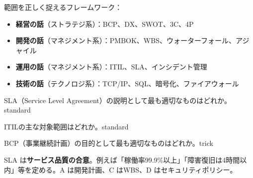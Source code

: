 \begin{keypoint}
範囲を正しく捉えるフレームワーク：
\begin{itemize}
  \item \textbf{経営の話}（ストラテジ系）：BCP、DX、SWOT、3C、4P
  \item \textbf{開発の話}（マネジメント系）：PMBOK、WBS、ウォーターフォール、アジャイル
  \item \textbf{運用の話}（マネジメント系）：ITIL、SLA、インシデント管理
  \item \textbf{技術の話}（テクノロジ系）：TCP/IP、SQL、暗号化、ファイアウォール
\end{itemize}
\end{keypoint}


\begin{mondai}{SLA（Service Level Agreement）の説明として最も適切なものはどれか。}{standard}
\end{mondai}

\begin{mondai}{ITILの主な対象範囲はどれか。}{standard}
\end{mondai}

\begin{mondai}{BCP（事業継続計画）の目的として最も適切なものはどれか。}{trick}
\end{mondai}

\kaitoupage


\begin{kaisetsu}
SLA は\textbf{サービス品質の合意}。例えば「稼働率99.9\%以上」「障害復旧は4時間以内」等を定める。A は開発計画、C はWBS、D はセキュリティポリシー。
\end{kaisetsu}


